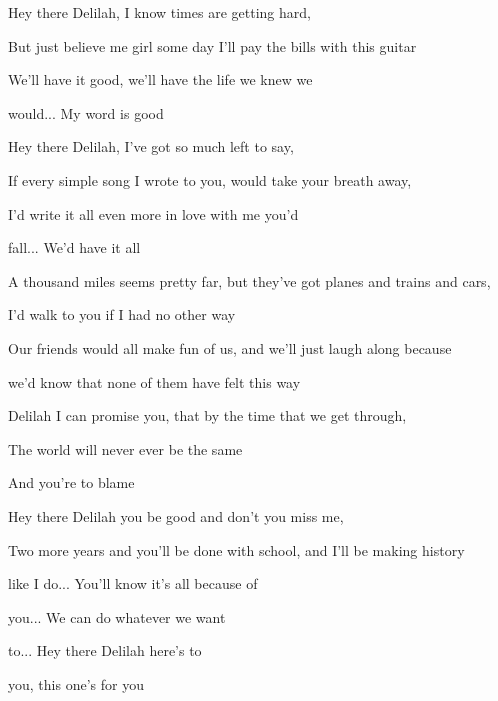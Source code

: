 \begin{song}
\bigskip

 Hey there Delilah, I know times are getting hard, \par
But just believe me girl some day I'll pay the bills with this guitar \par
We'll have it good,  we'll have the life we knew we \par
{}would... My word is good \par

\bigskip

 Hey there Delilah, I've got so much left to say, \par
If every simple song I wrote to you, would take your breath away, \par
I'd write it all even more in love with me you'd \par
{}fall... We'd have it all \par

\bigskip

\Chorus

\bigskip

A thousand miles seems pretty far, but they've got planes and trains and cars, \par
I'd walk to you if I had no other way \par
Our friends would all make fun of us, and we'll just laugh along because  \par
we'd know that none of them have felt this way \par
Delilah I can promise you, that by the time that we get through, \par
The world will never ever be the same \par
And you're to blame  \par

\bigskip

 Hey there Delilah you be good and don't you miss me, \par
Two more years and you'll be done with school, and I'll be making history \par
like I do...  You'll know it's all because of \par
{}you... We can do whatever we want \par
{}to...  Hey there Delilah here's to \par
{}you, this one’s for you \par

\bigskip

\Chorus

\end{song}
